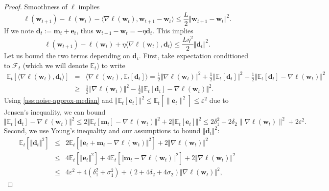 \documentclass[10pt]{article} %
\renewcommand{\vec}[1]{\bm{#1}}
\newcommand{\bw}{\bm{w}}
\newcommand{\EE}[2]{\mathbb{E}_{#1}\left[#2\right] }
\begin{document}
\begin{proof}
    
    Smoothness of $\ell$ implies
    \begin{equation*}
        \ell(\bw_{t+1}) - \ell(\bw_t) - \langle \nabla \ell(\bw_t), \bw_{t+1} - \bw_t \rangle \leq \frac{L}{2}\Vert \bw_{t+1} - \bw_t \Vert^2.
    \end{equation*}
    If we note $\vec{d}_t := \vec{m}_t + \vec{e}_t$, thus $\bw_{t+1} - \bw_t = -\eta \vec{d}_t$. This implies
    \begin{equation*}
        \ell(\bw_{t+1}) - \ell(\bw_t) + \eta \langle \nabla \ell(\bw_t), \vec{d}_t \rangle \leq \frac{L\eta^2}{2}\Vert \vec{d}_t \Vert^2.
    \end{equation*}
    Let us bound the two terms depending on $\vec{d}_t$.
    First, take expectation conditioned to $\mathcal{F}_t$ (which we will denote $\mathbb{E}_t$) to write
    \begin{eqnarray*}
        \EE{t}{\langle \nabla \ell(\bw_t), \vec{d}_t \rangle}
        & = &
        \langle \nabla \ell(\bw_t), \EE{t}{\vec{d}_t} \rangle
        =
        \frac{1}{2}\Vert \nabla \ell(\bw_t) \Vert^2 + \frac{1}{2}\Vert \EE{t}{\vec{d}_t} \Vert^2 - \frac{1}{2}\Vert \EE{t}{\vec{d}_t} - \nabla \ell(\bw_t) \Vert^2 \\
        & \geq &
        \frac{1}{2}\Vert \nabla \ell(\bw_t) \Vert^2 - \frac{1}{2}\Vert \EE{t}{\vec{d}_t} - \nabla \ell(\bw_t) \Vert^2.
    \end{eqnarray*}
    Using \eqref{ass:noise-approx-median} and $\Vert \EE{t}{\vec{e}_t} \Vert^2\leq \EE{t}{\|\vec{e}_t\|^2}\leq \varepsilon^2$ due to Jensen's inequality, we can bound
    \begin{equation*}
        \Vert \EE{t}{\vec{d}_t} - \nabla \ell(\bw_t) \Vert^2
        \leq 
        2 \Vert \EE{t}{\vec{m}_t} - \nabla \ell(\bw_t) \Vert^2
        +
        2 \Vert \EE{t}{\vec{e}_t} \Vert^2
        \leq 2\delta_1^2 + 2\delta_2 \|\nabla \ell(\bw_t)\|^2+ 2 \varepsilon^2.
    \end{equation*}
    Second, we use Young's inequality and our assumptions to bound $\Vert \vec{d}_t \Vert^2$:
    \begin{eqnarray*}
        \EE{t}{\Vert \vec{d}_t \Vert^2}
        & \leq &
        2\EE{t}{\Vert \vec{e}_t + \vec{m}_t - \nabla \ell(\bw_t) \Vert^2}
        +2 \Vert \nabla \ell(\bw_t) \Vert^2 \\
        &\leq & 
        4 \EE{t}{ \Vert \vec{e}_t \Vert^2} + 4 \EE{t}{\Vert \vec{m}_t - \nabla \ell(\bw_t) \Vert^2} +2 \Vert \nabla \ell(\bw_t) \Vert^2 \\
        & \leq & 
        4 \varepsilon^2 + 4(\delta_1^2+\sigma_1^2 ) + (2+4\delta_2+4\sigma_2) \Vert \nabla \ell(\bw_t) \Vert^2,

\end{eqnarray*}
\end{proof}
\end{document}
